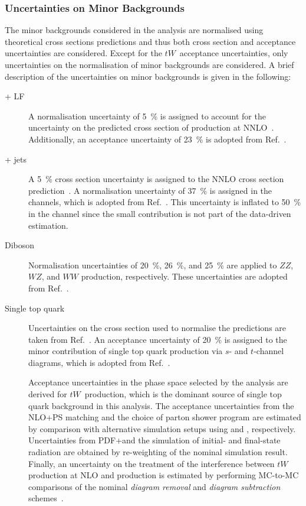 \subsubsection{Uncertainties on Minor Backgrounds}

The minor backgrounds considered in the analysis are normalised using
theoretical cross sections predictions and thus both cross section and
acceptance uncertainties are considered. Except for the $tW$~acceptance
uncertainties, only uncertainties on the normalisation of minor backgrounds are
considered. A brief description of the uncertainties on minor backgrounds is
given in the following:
\begin{description}

\item[\PZ + LF] A normalisation uncertainty of \SI{5}{\percent} is assigned to
  account for the uncertainty on the predicted cross section of \Zjets
  production at NNLO~\cite{Anastasiou:2003ds}. Additionally, an acceptance
  uncertainty of \SI{23}{\percent} is adopted from Ref.~\cite{HIGG-2018-51}.

\item[\PW + jets] A \SI{5}{\percent} cross section uncertainty is assigned to
  the NNLO cross section prediction~\cite{Anastasiou:2003ds}. A normalisation
  uncertainty of \SI{37}{\percent} is assigned in the \lephad channels, which is
  adopted from Ref.~\cite{HIGG-2018-51}. This uncertainty is inflated to
  \SI{50}{\percent} in the \hadhad channel since the small \Wjets contribution
  is not part of the data-driven \faketauhadvis estimation.

\item[Diboson] Normalisation uncertainties of \SI{20}{\percent},
  \SI{26}{\percent}, and \SI{25}{\percent} are applied to $ZZ$, $WZ$, and $WW$
  production, respectively. These uncertainties are adopted from
  Ref.~\cite{HIGG-2018-51}.

\item[Single top quark] Uncertainties on the cross section used to normalise the
  predictions are taken from Ref.~\cite{stopxsec}. An acceptance uncertainty of
  \SI{20}{\percent} is assigned to the minor contribution of single top quark
  production via $s$- and $t$-channel diagrams, which is adopted from
  Ref.~\cite{HIGG-2018-51}.

  Acceptance uncertainties in the phase space selected by the analysis are
  derived for $tW$~production, which is the dominant source of single top quark
  background in this analysis. The acceptance uncertainties from the NLO+PS
  matching and the choice of parton shower program are estimated by comparison
  with alternative simulation setups using \MGNLO and \HERWIG[7],
  respectively. Uncertainties from PDF+\alphas and the simulation of initial-
  and final-state radiation are obtained by re-weighting of the nominal
  simulation result. Finally, an uncertainty on the treatment of the
  interference between $tW$ production at NLO and \ttbar production is estimated
  by performing MC-to-MC comparisons of the nominal \emph{diagram removal} and
  \emph{diagram subtraction} schemes~\cite{Frixione:2008yi}.


\end{description}
